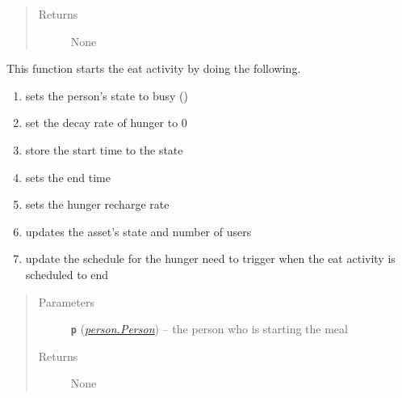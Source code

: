 \documentclass[letterpaper,10pt,english]{sphinxmanual}
\begin{document}
\begin{fulllineitems}
\begin{fulllineitems}
\begin{quote}
\begin{description}
\item[{Returns}] \leavevmode
None

\end{description}\end{quote}

\end{fulllineitems}


\begin{fulllineitems}
\label{eat:eat.Eat.start_meal}
This function starts the eat activity by doing the following.
\begin{enumerate}
\item {} 
sets the person's state to busy ()

\item {} 
set the decay rate of hunger to 0

\item {} 
store the start time to the state

\item {} 
sets the end time

\item {} 
sets the hunger recharge rate

\item {} 
updates the asset's state and number of users

\item {} 
update the schedule for the hunger need to trigger when the eat activity is scheduled to end

\end{enumerate}
\begin{quote}\begin{description}
\item[{Parameters}] \leavevmode
\textbf{\texttt{p}} ({\hyperref[person:person.Person]{\emph{\emph{person.Person}}}}) -- the person who is starting the meal

\item[{Returns}] \leavevmode
None

\end{description}\end{quote}

\end{fulllineitems}


\begin{fulllineitems}
\label{eat:eat.Eat.test_func}
\end{fulllineitems}


\end{fulllineitems}
\end{document}
